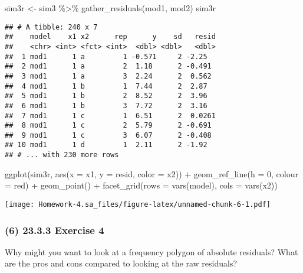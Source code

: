\documentclass[
]{article}
\newenvironment{Shaded}{\begin{snugshade}}{\end{snugshade}}
\newcommand{\AttributeTok}[1]{\textcolor[rgb]{0.77,0.63,0.00}{#1}}
\newcommand{\DecValTok}[1]{\textcolor[rgb]{0.00,0.00,0.81}{#1}}
\newcommand{\FunctionTok}[1]{\textcolor[rgb]{0.00,0.00,0.00}{#1}}
\newcommand{\NormalTok}[1]{#1}
\newcommand{\OtherTok}[1]{\textcolor[rgb]{0.56,0.35,0.01}{#1}}
\newcommand{\SpecialCharTok}[1]{\textcolor[rgb]{0.00,0.00,0.00}{#1}}
\newcommand{\StringTok}[1]{\textcolor[rgb]{0.31,0.60,0.02}{#1}}
\begin{document}
\begin{Shaded}
\begin{Highlighting}[]
\NormalTok{sim3r }\OtherTok{\textless{}{-}}\NormalTok{ sim3 }\SpecialCharTok{\%\textgreater{}\%}
  \FunctionTok{gather\_residuals}\NormalTok{(mod1, mod2)}
\NormalTok{sim3r}
\end{Highlighting}
\end{Shaded}

\begin{verbatim}
## # A tibble: 240 x 7
##    model    x1 x2      rep      y    sd   resid
##    <chr> <int> <fct> <int>  <dbl> <dbl>   <dbl>
##  1 mod1      1 a         1 -0.571     2 -2.25  
##  2 mod1      1 a         2  1.18      2 -0.491 
##  3 mod1      1 a         3  2.24      2  0.562 
##  4 mod1      1 b         1  7.44      2  2.87  
##  5 mod1      1 b         2  8.52      2  3.96  
##  6 mod1      1 b         3  7.72      2  3.16  
##  7 mod1      1 c         1  6.51      2  0.0261
##  8 mod1      1 c         2  5.79      2 -0.691 
##  9 mod1      1 c         3  6.07      2 -0.408 
## 10 mod1      1 d         1  2.11      2 -1.92  
## # ... with 230 more rows
\end{verbatim}

\begin{Shaded}
\begin{Highlighting}[]
\FunctionTok{ggplot}\NormalTok{(sim3r, }\FunctionTok{aes}\NormalTok{(}\AttributeTok{x =}\NormalTok{ x1, }\AttributeTok{y =}\NormalTok{ resid, }\AttributeTok{color =}\NormalTok{ x2)) }\SpecialCharTok{+}
  \FunctionTok{geom\_ref\_line}\NormalTok{(}\AttributeTok{h =} \DecValTok{0}\NormalTok{, }\AttributeTok{colour =} \StringTok{\textquotesingle{}red\textquotesingle{}}\NormalTok{) }\SpecialCharTok{+}
  \FunctionTok{geom\_point}\NormalTok{() }\SpecialCharTok{+}
  \FunctionTok{facet\_grid}\NormalTok{(}\AttributeTok{rows =} \FunctionTok{vars}\NormalTok{(model), }\AttributeTok{cols =} \FunctionTok{vars}\NormalTok{(x2))}
\end{Highlighting}
\end{Shaded}

\texttt{[image: Homework-4.sa\_files/figure-latex/unnamed-chunk-6-1.pdf]}

\hypertarget{exercise-4}{%
\subsubsection{(6) 23.3.3 Exercise 4}\label{exercise-4}}

Why might you want to look at a frequency polygon of absolute residuals?
What are the pros and cons compared to looking at the raw residuals?
\end{document}
